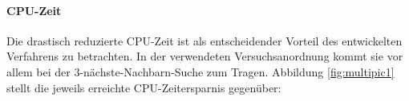 \paragraph*{CPU-Zeit}
Die drastisch reduzierte CPU-Zeit ist als entscheidender Vorteil des entwickelten Verfahrens zu betrachten. In der verwendeten Versuchsanordnung kommt sie vor allem bei der 3-nächste-Nachbarn-Suche zum Tragen. Abbildung \ref{fig:multipic1} stellt die jeweils erreichte CPU-Zeitersparnis gegenüber:
\begin{figure}[hpbt]
 \centering
  \hspace{0.01\textwidth}
  \\[0pt] %
  \hspace{0.01\textwidth}

\end{figure}
